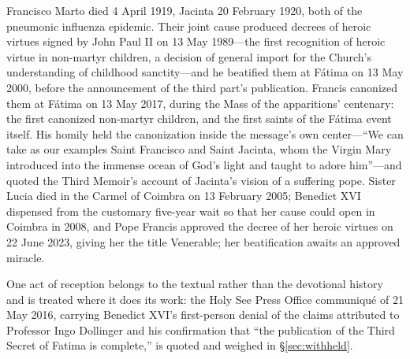 Francisco Marto died 4 April 1919, Jacinta 20 February 1920, both of
the pneumonic influenza epidemic. Their joint cause produced decrees
of heroic virtues signed by John Paul II on 13 May 1989---the first
recognition of heroic virtue in non-martyr children, a decision of
general import for the Church's understanding of childhood
sanctity---and he beatified them at F\'atima on 13 May 2000, before
the announcement of the third part's publication. Francis canonized
them at F\'atima on 13 May 2017, during the Mass of the apparitions'
centenary: the first canonized non-martyr children, and the first
saints of the F\'atima event itself. His homily held the canonization
inside the message's own center---``We can take as our examples Saint
Francisco and Saint Jacinta, whom the Virgin Mary introduced into the
immense ocean of God's light and taught to adore him''---and quoted
the Third Memoir's account of Jacinta's vision of a suffering
pope.
Sister Lucia died in the Carmel of Coimbra on 13 February 2005;
Benedict XVI dispensed from the customary five-year wait so that her
cause could open in Coimbra in 2008, and Pope
Francis approved the decree of her heroic virtues on 22 June 2023,
giving her the title Venerable; her beatification awaits an approved
miracle.

One act of reception belongs to the textual rather than the
devotional history and is treated where it does its work: the Holy
See Press Office communiqu\'e of 21 May 2016, carrying Benedict XVI's
first-person denial of the claims attributed to Professor Ingo
Dollinger and his confirmation that ``the publication of the Third
Secret of Fatima is complete,'' is quoted and weighed in
\S\ref{sec:withheld}.

